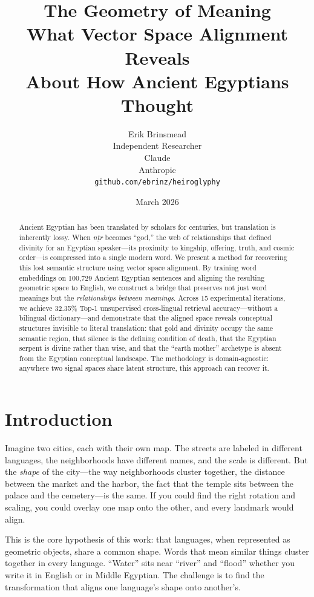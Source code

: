 \documentclass[11pt, a4paper]{article}
\title{
    \textbf{The Geometry of Meaning}\\[6pt]
    {\large What Vector Space Alignment Reveals\\About How Ancient Egyptians Thought}
}
\author{
    Erik Brinsmead \\
    Independent Researcher \\[6pt]
    Claude \\
    Anthropic \\[12pt]
    \texttt{github.com/ebrinz/heiroglyphy}
}
\date{March 2026}
\begin{document}
\maketitle

\begin{abstract}
Ancient Egyptian has been translated by scholars for centuries, but translation is inherently lossy. When \textit{n\d{t}r} becomes ``god,'' the web of relationships that defined divinity for an Egyptian speaker---its proximity to kingship, offering, truth, and cosmic order---is compressed into a single modern word. We present a method for recovering this lost semantic structure using vector space alignment. By training word embeddings on 100,729 Ancient Egyptian sentences and aligning the resulting geometric space to English, we construct a bridge that preserves not just word meanings but the \textit{relationships between meanings}. Across 15 experimental iterations, we achieve 32.35\% Top-1 unsupervised cross-lingual retrieval accuracy---without a bilingual dictionary---and demonstrate that the aligned space reveals conceptual structures invisible to literal translation: that gold and divinity occupy the same semantic region, that silence is the defining condition of death, that the Egyptian serpent is divine rather than wise, and that the ``earth mother'' archetype is absent from the Egyptian conceptual landscape. The methodology is domain-agnostic: anywhere two signal spaces share latent structure, this approach can recover it.
\end{abstract}

\section{Introduction}
\label{sec:intro}

Imagine two cities, each with their own map. The streets are labeled in different languages, the neighborhoods have different names, and the scale is different. But the \textit{shape} of the city---the way neighborhoods cluster together, the distance between the market and the harbor, the fact that the temple sits between the palace and the cemetery---is the same. If you could find the right rotation and scaling, you could overlay one map onto the other, and every landmark would align.

This is the core hypothesis of this work: that languages, when represented as geometric objects, share a common shape. Words that mean similar things cluster together in every language. ``Water'' sits near ``river'' and ``flood'' whether you write it in English or in Middle Egyptian. The challenge is to find the transformation that aligns one language's shape onto another's.
\end{document}
